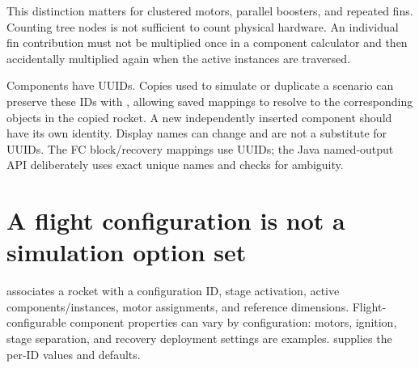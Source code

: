 This distinction matters for clustered motors, parallel boosters, and repeated fins. Counting tree nodes is not sufficient to count physical hardware. An individual fin contribution must not be multiplied once in a component calculator and then accidentally multiplied again when the active instances are traversed.

Components have UUIDs. Copies used to simulate or duplicate a scenario can preserve these IDs with , allowing saved mappings to resolve to the corresponding objects in the copied rocket. A new independently inserted component should have its own identity. Display names can change and are not a substitute for UUIDs. The FC block/recovery mappings use UUIDs; the Java named-output API deliberately uses exact unique names and checks for ambiguity.


\section{A flight configuration is not a simulation option set}
 associates a rocket with a configuration ID, stage activation, active components/instances, motor assignments, and reference dimensions. Flight-configurable component properties can vary by configuration: motors, ignition, stage separation, and recovery deployment settings are examples.  supplies the per-ID values and defaults.

